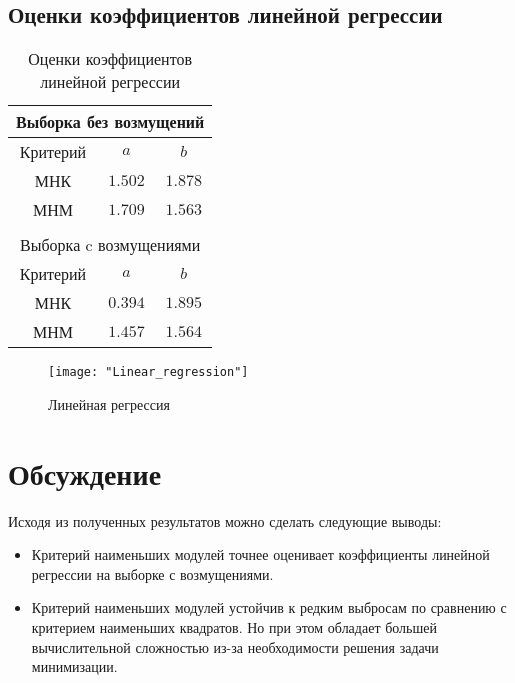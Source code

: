 \documentclass[12pt,a4paper]{article}
\begin{document}
	\subsection{Оценки коэффициентов линейной регрессии}
	\begin{center}
		\begin{table}[h!]
			\begin{center}
				\begin{tabular}{|c|c|c|}
					\multicolumn{3}{c}{Выборка без возмущений} \\
					\hline
					Критерий & $a$ & $b$\\
					\hline
					МНК & $1.502$ & $1.878$\\
					\hline
					МНМ & $1.709$ & $1.563$\\
					\hline
					\multicolumn{3}{c}{ } \\
					\multicolumn{3}{c}{Выборка c возмущениями} \\
					\hline
					Критерий & $a$ & $b$\\
					\hline
					МНК & $0.394$ & $1.895$\\
					\hline
					МНМ & $1.457$ & $1.564$\\
					\hline					
				\end{tabular}
				\caption{Оценки коэффициентов линейной регрессии}
			\end{center}
		\end{table}
		
		\begin{figure}[h!]
			\texttt{[image: "Linear\_regression"]} 
			\caption[Линейная регрессия]{Линейная регрессия}
		\end{figure}
	\end{center}

	\newpage
	\section{Обсуждение}
	Исходя из полученных результатов можно сделать следующие выводы:
	\begin{itemize}		
		\item Критерий наименьших модулей точнее оценивает коэффициенты линейной регрессии на выборке с возмущениями.
		
		\item Критерий наименьших модулей устойчив к редким выбросам по сравнению с критерием наименьших квадратов. Но при этом обладает большей вычислительной сложностью из-за необходимости решения задачи минимизации.
	\end{itemize}
	
\end{document}
